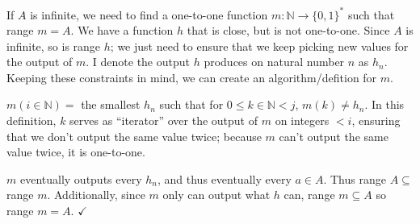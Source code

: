 \documentclass[11pt]{article}
\let\imp\rightarrow
\begin{document}
If $A$ is infinite, we need to find a one-to-one function $m: \mathbb{N} \imp \{0,1\}^*$ such that range $m = A$.
We have a function $h$ that is close, but is not one-to-one.
Since $A$ is infinite, so is range $h$; we just need to ensure that we keep picking new values for the output of $m$.
I denote the output $h$ produces on natural number $n$ as $h_n$.
Keeping these constraints in mind, we can create an algorithm/defition for $m$. 

$m(i \in \mathbb{N}) = $ the smallest $h_n$ such that for $0 \leq k \in \mathbb{N} < j$, $m( k ) \neq h_n$.
In this definition, $k$ serves as ``iterator'' over the output of $m$ on integers $< i$, ensuring that we don't output the same value twice; because $m$ can't output the same value twice, it is one-to-one.

$m$ eventually outputs every $h_n$, and thus eventually every $a \in A$. 
Thus range $A \subseteq $ range $m$.
Additionally, since $m$ only can output what $h$ can, range $m \subseteq A$ so range $m = A$. $\checkmark$
\end{document}
